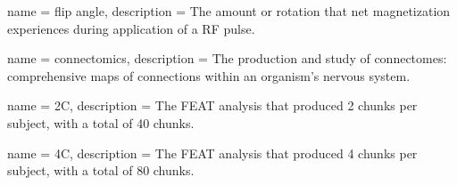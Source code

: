 {
	name = {flip angle},
	description = {The amount or rotation that net magnetization experiences during application of a RF pulse.\newline}
}

{
	name = {connectomics},
	description = {The production and study of connectomes: comprehensive maps of connections within an organism's nervous system.\newline}
}

{
	name = {2C},
	description = {The FEAT analysis that produced 2 chunks per subject, with a total of 40 chunks.\newline}
}

{
	name = {4C},
	description = {The FEAT analysis that produced 4 chunks per subject, with a total of 80 chunks.\newline}
}